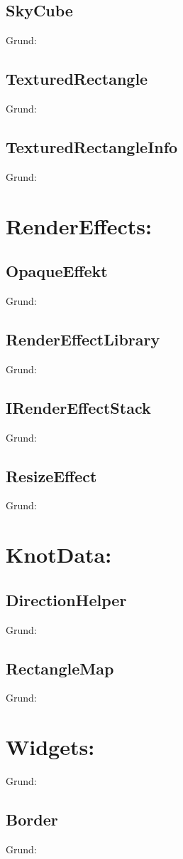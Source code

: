 \subsection{SkyCube}
Grund:
\subsection{TexturedRectangle}
Grund:
\subsection{TexturedRectangleInfo}
Grund:

\section{RenderEffects:}
\subsection{OpaqueEffekt}
Grund:
\subsection{RenderEffectLibrary}
Grund:
\subsection{IRenderEffectStack}
Grund:
\subsection{ResizeEffect}
Grund:

\section{KnotData:}
\subsection{DirectionHelper}
Grund:
\subsection{RectangleMap}
Grund:

\section{Widgets:}
Grund:
\subsection{Border}
Grund:
